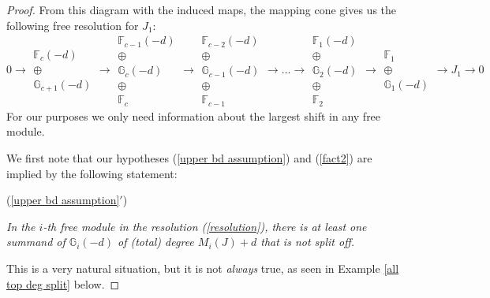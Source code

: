 \documentclass[12pt,twoside]{amsart}
\numberwithin{equation}{section}
\theoremstyle{definition}
\begin{document}
\begin{proof}
From this diagram with the induced maps, the  mapping cone gives us the following free resolution
for
$J_1$:
\begin{equation} \label{resolution}
0 \rightarrow
\begin{array}{c}
\mathbb F_c(-d) \\
\oplus \\
\mathbb G_{c+1}(-d)
\end{array}
\rightarrow
\begin{array}{c}
\mathbb F_{c-1}(-d) \\
\oplus \\
\mathbb G_{c}(-d) \\
\oplus \\
\mathbb F_{c}
\end{array}
\rightarrow
\begin{array}{c}
\mathbb F_{c-2}(-d) \\
\oplus \\
\mathbb G_{c-1}(-d) \\
\oplus \\
\mathbb F_{c-1}
\end{array}
\rightarrow
\dots
\rightarrow
\begin{array}{c}
\mathbb F_{1}(-d) \\
\oplus \\
\mathbb G_{2}(-d) \\
\oplus \\
\mathbb F_{2}
\end{array}
\rightarrow
\begin{array}{c}
\mathbb F_1 \\
\oplus \\
\mathbb G_1(-d)
\end{array}
\rightarrow J_1 \rightarrow 0
\end{equation}
For our
purposes we only need information about the largest shift in any free module.

We first note that our hypotheses (\ref{upper bd assumption}) and (\ref{fact2}) are
implied by the following statement:


\medskip


\noindent (\ref{upper bd assumption}$'$) \ \ \ \parbox{5.5 in} {\em In the $i$-th free
module in the  resolution (\ref{resolution}), there is at least one summand of ${\mathbb
G}_i(-d)$ of (total) degree $M_i(J)+d$ that is not split off.}

\medskip

\noindent
This is a very natural situation, but it is not {\em always} true, as seen in Example
\ref{all top deg split} below.


\end{proof}
\end{document}
